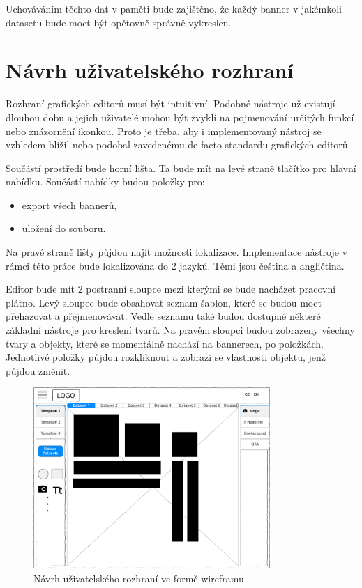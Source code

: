     Uchováváním těchto dat v paměti bude zajištěno, že každý banner v jakémkoli datasetu bude moct být opětovně správně vykreslen.

    \section{Návrh uživatelského rozhraní}
    Rozhraní grafických editorů musí být intuitivní. Podobné nástroje už existují dlouhou dobu a jejich uživatelé mohou být zvyklí na pojmenování určitých funkcí
    nebo znázornění ikonkou. Proto je třeba, aby i implementovaný nástroj se vzhledem blížil nebo podobal zavedenému de facto standardu grafických editorů. 

    Součástí prostředí bude horní lišta. Ta bude mít na levé straně tlačítko pro hlavní nabídku. Součástí nabídky budou položky pro:
    \begin{itemize}
        \item export všech bannerů,
        \item uložení do souboru.
    \end{itemize}
    Na pravé straně lišty půjdou najít možnosti lokalizace. Implementace nástroje v rámci této práce bude lokalizována do 2 jazyků. Těmi jsou čeština a angličtina. 

    Editor bude mít 2 postranní sloupce mezi kterými se bude nacházet pracovní plátno. Levý sloupec bude obsahovat seznam šablon,
    které se budou moct přehazovat a přejmenovávat. Vedle seznamu také budou dostupné některé základní nástroje pro kreslení tvarů.
    Na pravém sloupci budou zobrazeny všechny tvary a objekty, které se momentálně nachází na bannerech, po položkách.
    Jednotlivé položky půjdou rozkliknout a zobrazí se vlastnosti objektu, jenž půjdou změnit.

    \begin{figure}[ht]
        \centering
        \includegraphics[width=0.8\textwidth]{Figures/wireframe.pdf}
        \caption[Wireframe UI]{Návrh uživatelského rozhraní ve formě wireframu}
        \label{fig:ui-wireframe}
    \end{figure}

